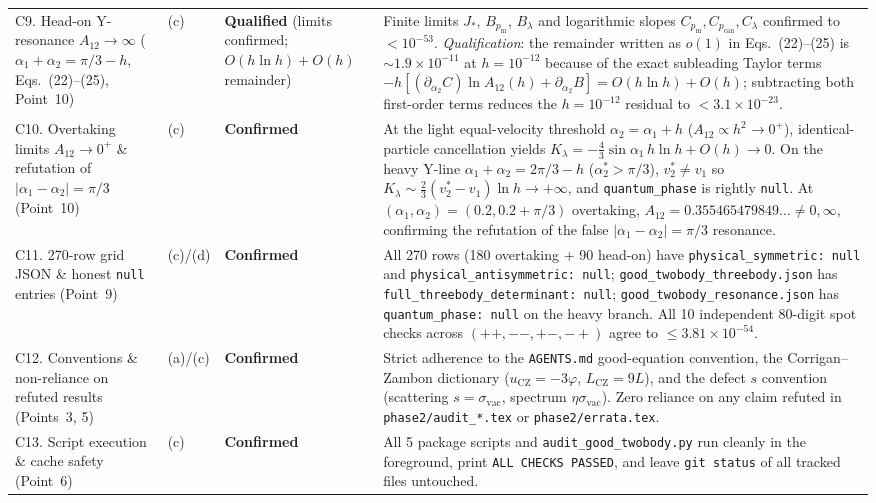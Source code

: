\documentclass[11pt,a4paper]{article}
\begin{document}
\begin{center}
\begin{longtable}{@{}p{2.9cm}p{0.8cm}p{1.9cm}p{9.9cm}@{}}
\addlinespace
C9. Head-on Y-resonance $A_{12}\to\infty$ ($\alpha_1+\alpha_2=\pi/3-h$, Eqs.~(22)--(25), Point~10) & (c) & \textbf{Qualified} (limits confirmed; $O(h\ln h)+O(h)$ remainder) & Finite limits $J_*$, $B_{p_{\mathrm{m}}}$, $B_\lambda$ and logarithmic slopes $C_{p_{\mathrm{m}}}, C_{p_{\mathrm{can}}}, C_\lambda$ confirmed to $<10^{-53}$. \emph{Qualification}: the remainder written as $o(1)$ in Eqs.~(22)--(25) is $\sim 1.9\times 10^{-11}$ at $h=10^{-12}$ because of the exact subleading Taylor terms $-h[(\partial_{\alpha_2}C)\ln A_{12}(h) + \partial_{\alpha_2}B] = O(h\ln h)+O(h)$; subtracting both first-order terms reduces the $h=10^{-12}$ residual to $<3.1\times 10^{-23}$. \\
\addlinespace
C10. Overtaking limits $A_{12}\to 0^+$ \& refutation of $|\alpha_1-\alpha_2|=\pi/3$ (Point~10) & (c) & \textbf{Confirmed} & At the light equal-velocity threshold $\alpha_2=\alpha_1+h$ ($A_{12}\propto h^2\to 0^+$), identical-particle cancellation yields $K_\lambda = -\tfrac{4}{3}\sin\alpha_1\,h\ln h + O(h)\to 0$. On the heavy Y-line $\alpha_1+\alpha_2=2\pi/3-h$ ($\alpha_2^*>\pi/3$), $v_2^*\neq v_1$ so $K_\lambda \sim \tfrac{2}{3}(v_2^*-v_1)\ln h \to +\infty$, and \texttt{quantum\_phase} is rightly \texttt{null}. At $(\alpha_1,\alpha_2)=(0.2,0.2+\pi/3)$ overtaking, $A_{12}=0.355465479849\dots \neq 0,\infty$, confirming the refutation of the false $|\alpha_1-\alpha_2|=\pi/3$ resonance. \\
\addlinespace
C11. 270-row grid JSON \& honest \texttt{null} entries (Point~9) & (c)/(d) & \textbf{Confirmed} & All 270 rows (180 overtaking + 90 head-on) have \texttt{physical\_symmetric: null} and \texttt{physical\_antisymmetric: null}; \texttt{good\_twobody\_threebody.json} has \texttt{full\_threebody\_determinant: null}; \texttt{good\_twobody\_resonance.json} has \texttt{quantum\_phase: null} on the heavy branch. All 10 independent 80-digit spot checks across $(++,--,+-, -+)$ agree to $\le 3.81\times 10^{-54}$. \\
\addlinespace
C12. Conventions \& non-reliance on refuted results (Points~3, 5) & (a)/(c) & \textbf{Confirmed} & Strict adherence to the \texttt{AGENTS.md} good-equation convention, the Corrigan--Zambon dictionary ($u_{\mathrm{CZ}}=-3\varphi$, $L_{\mathrm{CZ}}=9L$), and the defect $s$ convention (scattering $s=\sigma_{\mathrm{vac}}$, spectrum $\eta\sigma_{\mathrm{vac}}$). Zero reliance on any claim refuted in \texttt{phase2/audit\_*.tex} or \texttt{phase2/errata.tex}. \\
\addlinespace
C13. Script execution \& cache safety (Point~6) & (c) & \textbf{Confirmed} & All 5 package scripts and \texttt{audit\_good\_twobody.py} run cleanly in the foreground, print \texttt{ALL CHECKS PASSED}, and leave \texttt{git status} of all tracked files untouched. \\
\bottomrule
\end{longtable}
\end{center}
\end{document}
